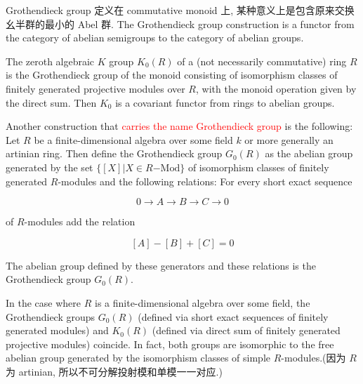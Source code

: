 \documentclass{ctexart}
\begin{document}
Grothendieck group 定义在 commutative monoid 上, 某种意义上是包含原来交换幺半群的最小的 Abel 群.
The Grothendieck group construction is a functor from the category of abelian semigroups to the category of abelian groups.

The zeroth algebraic $K$ group $K_0(R)$ of a (not necessarily commutative) ring $R$ is the Grothendieck group of the monoid consisting of isomorphism classes of finitely generated projective modules over $R$, with the monoid operation given by the direct sum. Then $K_0$ is a covariant functor from rings to abelian groups.

Another construction that \textcolor{red}{carries the name Grothendieck group} is the following: Let $R$ be a finite-dimensional algebra over some field $k$ or more generally an artinian ring. Then define the Grothendieck group $G_0(R)$ as the abelian group generated by the set $\{[X]|X\in R\mathrm {-Mod} \}$ of isomorphism classes of finitely generated $R$-modules and the following relations: For every short exact sequence

    \[0\to A\to B\to C\to 0\]

of $R$-modules add the relation

    \[[A]-[B]+[C]=0\]

The abelian group defined by these generators and these relations is the Grothendieck group $G_0(R)$.

In the case where $R$ is a finite-dimensional algebra over some field, the Grothendieck groups $G_0(R)$ (defined via short exact sequences of finitely generated modules) and $K_0(R)$ (defined via direct sum of finitely generated projective modules) coincide. In fact, both groups are isomorphic to the free abelian group generated by the isomorphism classes of simple $R$-modules.(因为 $R$ 为 artinian, 所以不可分解投射模和单模一一对应.)
\end{document}
